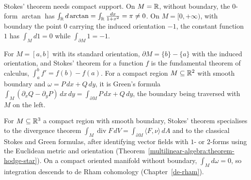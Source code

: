 \begin{counterexample}\label{differential-forms:counterexample-stokes-support}
Stokes' theorem needs compact support. On $M = \mathbb{R}$, without boundary, the $0$-form $\arctan$ has $\int_{\mathbb{R}} d\arctan = \int_{\mathbb{R}}\frac{dx}{1 + x^2} = \pi \neq 0$. On $M = [0, +\infty)$, with boundary the point $0$ carrying the induced orientation $-1$,
the constant function $1$ has $\int_Md1 = 0$ while $\int_{\partial M}1 = -1$.
\end{counterexample}

\begin{example}\label{differential-forms:example-stokes-dimension-one}
For $M = [a, b]$ with its standard orientation, $\partial M = \{b\} - \{a\}$ with the induced orientation, and Stokes' theorem for a function $f$ is the fundamental theorem of calculus, $\int_a^bf' = f(b) - f(a)$. For a compact region
$M \subseteq \mathbb{R}^2$ with smooth boundary and $\omega = P\,dx + Q\,dy$, it is Green's formula $\int_M(\partial_xQ - \partial_yP)\,dx\,dy = \int_{\partial M}P\,dx + Q\,dy$, the boundary being traversed with $M$ on the left.
\end{example}

\begin{example}\label{differential-forms:example-classical}
For $M \subseteq \mathbb{R}^3$ a compact region with smooth boundary, Stokes' theorem specialises to the divergence theorem $\int_M\operatorname{div}F\,dV = \int_{\partial M}\langle F, \nu\rangle\,dA$ and to the classical
Stokes and Green formulas, after identifying vector fields with $1$- or $2$-forms using the Euclidean metric and orientation (Theorem~\ref{multilinear-algebra:theorem-hodge-star}). On a compact oriented
manifold without boundary, $\int_M d\omega = 0$, so integration descends to de Rham cohomology (Chapter~\ref{de-rham}).
\end{example}


